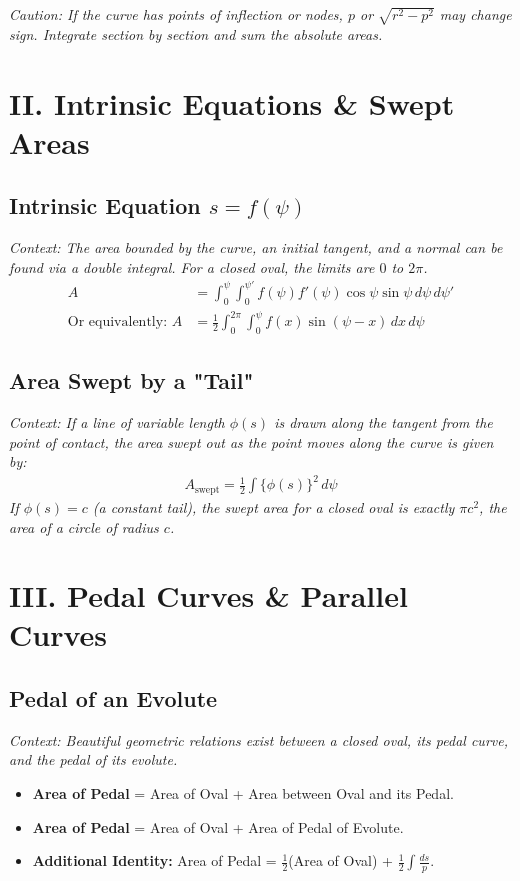 \documentclass[11pt, a4paper]{article}
\begin{document}
\vspace{0.2cm}

\textit{\small Caution: If the curve has points of inflection or nodes, $p$ or $\sqrt{r^2-p^2}$ may change sign. Integrate section by section and sum the absolute areas.}


\section*{\color{primary} II. Intrinsic Equations \& Swept Areas}

\subsection*{\color{secondary} Intrinsic Equation $s = f(\psi)$}
\textit{\small Context: The area bounded by the curve, an initial tangent, and a normal can be found via a double integral. For a closed oval, the limits are $0$ to $2\pi$.}
\begin{align*}
    A &= \int_0^\psi \int_0^{\psi'} f(\psi) f'(\psi) \cos \psi \sin \psi \, d\psi \, d\psi' \\
    \text{Or equivalently: } A &= \frac{1}{2} \int_0^{2\pi} \int_0^\psi f(x) \sin(\psi-x) \, dx \, d\psi
\end{align*}

\subsection*{\color{secondary} Area Swept by a "Tail"}
\textit{\small Context: If a line of variable length $\phi(s)$ is drawn along the tangent from the point of contact, the area swept out as the point moves along the curve is given by:}
\begin{align*}
    A_{\text{swept}} = \frac{1}{2} \int \{\phi(s)\}^2 \, d\psi
\end{align*}
\textit{\small If $\phi(s) = c$ (a constant tail), the swept area for a closed oval is exactly $\pi c^2$, the area of a circle of radius $c$.}

\section*{\color{primary} III. Pedal Curves \& Parallel Curves}

\subsection*{\color{secondary} Pedal of an Evolute}
\textit{\small Context: Beautiful geometric relations exist between a closed oval, its pedal curve, and the pedal of its evolute.}
\begin{itemize}[leftmargin=*, nosep]
    \item \textbf{Area of Pedal} = Area of Oval + Area between Oval and its Pedal.
    \item \textbf{Area of Pedal} = Area of Oval + Area of Pedal of Evolute.
    \item \textbf{\color{accent}Additional Identity:} Area of Pedal = $\frac{1}{2}$(Area of Oval) + $\frac{1}{2} \int \frac{ds}{p}$.
\end{itemize}
\end{document}
